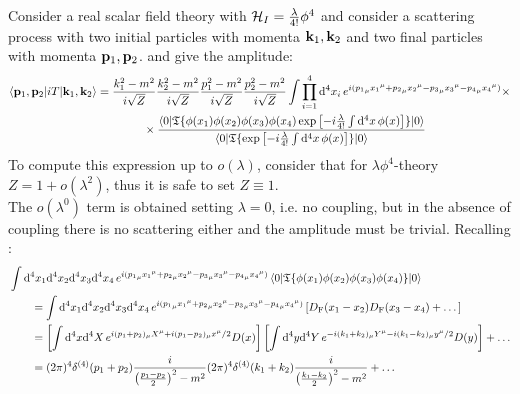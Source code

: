 Consider a real scalar field theory with $ \mathcal{H}_I = \frac{\lambda}{4!} \phi^4 $ and consider a scattering process with two initial particles with momenta $ \mathbf{k}_1 , \mathbf{k}_2 $ and two final particles with momenta $ \mathbf{p}_1 , \mathbf{p}_2 $.  and  give the amplitude:
\begin{equation*}
  \begin{split}
    \braket{\mathbf{p}_1 , \mathbf{p}_2 | i T | \mathbf{k}_1 , \mathbf{k}_2}
    & = \frac{k_1^2 - m^2}{i \sqrt{Z}} \frac{k_2^2 - m^2}{i \sqrt{Z}} \frac{p_1^2 - m^2}{i \sqrt{Z}} \frac{p_2^2 - m^2}{i \sqrt{Z}} \int \prod_{i = 1}^4 \mathrm{d}^4x_i\, e^{i ({p_1}_\mu {x_1}^\mu + {p_2}_\mu {x_2}^\mu - {p_3}_\mu {x_3}^\mu - {p_4}_\mu {x_4}^\mu)} \times \\
    & \qquad \qquad \times \frac{\braket{0 | \mathfrak{T}\{ \phi(x_1) \phi(x_2) \phi(x_3) \phi(x_4) \exp \left[ -i \frac{\lambda}{4!} \int \mathrm{d}^4x\, \phi(x) \right] \} | 0}}{\braket{0 | \mathfrak{T}\{\exp \left[ - i \frac{\lambda}{4!} \int \mathrm{d}^4x\, \phi(x) \right]\} | 0}}
  \end{split}
\end{equation*}
To compute this expression up to $ o(\lambda) $, consider that for $ \lambda \phi^4 $-theory $ Z = 1 + o(\lambda^2) $, thus it is safe to set $ Z \equiv 1 $. \\
The $ o(\lambda^0) $ term is obtained setting $ \lambda = 0 $, i.e. no coupling, but in the absence of coupling there is no scattering either and the amplitude must be trivial. Recalling :
\begin{equation*}
  \begin{split}
    & \int \mathrm{d}^4x_1 \mathrm{d}^4x_2 \mathrm{d}^4x_3 \mathrm{d}^4x_4\, e^{i ({p_1}_\mu {x_1}^\mu + {p_2}_\mu {x_2}^\mu - {p_3}_\mu {x_3}^\mu - {p_4}_\mu {x_4}^\mu)} \braket{0 | \mathfrak{T}\{\phi(x_1) \phi(x_2) \phi(x_3) \phi(x_4)\} | 0} \\
    & \qquad = \int \mathrm{d}^4x_1 \mathrm{d}^4x_2 \mathrm{d}^4x_3 \mathrm{d}^4x_4\, e^{i ({p_1}_\mu {x_1}^\mu + {p_2}_\mu {x_2}^\mu - {p_3}_\mu {x_3}^\mu - {p_4}_\mu {x_4}^\mu)} \left[ D_\text{F}(x_1 - x_2) D_\text{F}(x_3 - x_4) + \dots \right] \\
    & \qquad = \left[ \int \mathrm{d}^4x \mathrm{d}^4X\, e^{i (p_1 + p_2)_\mu X^\mu + i (p_1 - p_2)_\mu x^\mu/2} D(x) \right] \left[ \int \mathrm{d}^4y \mathrm{d}^4Y\, e^{- i (k_1 + k_2)_\mu Y^\mu - i (k_1 - k_2)_\mu y^\mu/2} D(y) \right] + \dots \\
    & \qquad = (2\pi)^4 \delta^{(4)}(p_1 + p_2) \frac{i}{\left( \frac{p_1 - p_2}{2} \right)^2 - m^2} (2\pi)^4 \delta^{(4)}(k_1 + k_2) \frac{i}{\left( \frac{k_1 - k_2}{2} \right)^2 - m^2} + \dots
  \end{split}
\end{equation*}

